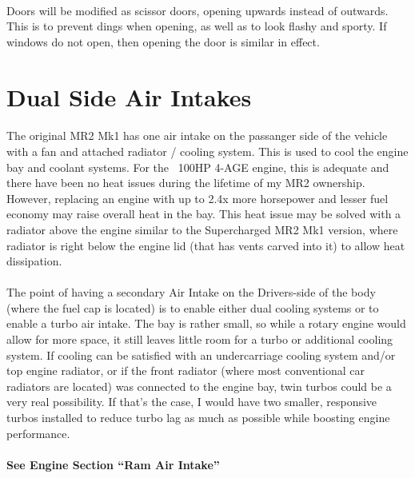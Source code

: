 \documentclass[a4paper,10pt]{report}
\begin{document}
\paragraph*{}Doors will be modified as scissor doors, opening upwards instead of outwards. This is to prevent dings when opening, as well as to look flashy and sporty. If windows do not open, then opening the door is similar in effect.


\section{Dual Side Air Intakes}
\paragraph*{}The original MR2 Mk1 has one air intake on the passanger side of the vehicle with a fan and attached radiator / cooling system. This is used to cool the engine bay and coolant systems. For the ~100HP 4-AGE engine, this is adequate and there have been no heat issues during the lifetime of my MR2 ownership. However, replacing an engine with up to 2.4x more horsepower and lesser fuel economy may raise overall heat in the bay. This heat issue may be solved with a radiator above the engine similar to the Supercharged MR2 Mk1 version, where radiator is right below the engine lid (that has vents carved into it) to allow heat dissipation. 
\paragraph*{}The point of having a secondary Air Intake on the Drivers-side of the body (where the fuel cap is located) is to enable either dual cooling systems or to enable a turbo air intake. The bay is rather small, so while a rotary engine would allow for more space, it still leaves little room for a turbo or additional cooling system. If cooling can be satisfied with an undercarriage cooling system and/or top engine radiator, or if the front radiator (where most conventional car radiators are located) was connected to the engine bay, twin turbos could be a very real possibility. If that's the case, I would have two smaller, responsive turbos installed to reduce turbo lag as much as possible while boosting engine performance.
\paragraph*{See Engine Section ``Ram Air Intake'' }
\end{document}
